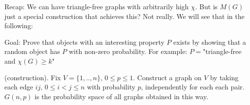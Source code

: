 Recap: We can have triangle-free graphs with arbitrarily high $\chi$. But is $M(G)$ just a special construction that achieves this? Not really. We will see that in the following:

Goal: Prove that objects with an interesting property $P$ exists by showing that a random object has $P$ with non-zero probability. For example: $P=$"triangle-free and $\chi(G)\geq k$"

\begin{definition} (construction). Fix $V=\{1,..,n\}, \, 0\leq p\leq 1$. Construct a graph on $V$ by taking each edge $ij$, $0 \leq i <j \leq n$ with probability $p$, independently for each each pair. \\
$G(n,p)$ is the probability space of all graphs obtained in this way.

\end{definition}

